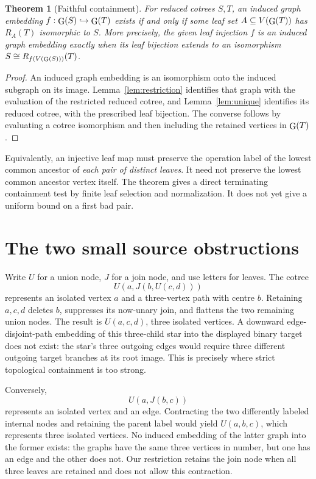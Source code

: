 \documentclass[11pt]{article}
\newtheorem{theorem}{Theorem}
\newcommand{\ev}{\mathop{\rm G}}
\begin{document}
\begin{theorem}[Faithful containment]\label{thm:faithful}
For reduced cotrees $S,T$, an induced graph embedding
$f:\ev(S)\hookrightarrow\ev(T)$ exists if and only if some leaf set
$A\subseteq V(\ev(T))$ has $R_A(T)$ isomorphic to $S$. More precisely,
the given leaf injection $f$ is an induced graph embedding exactly when
its leaf bijection extends to an isomorphism
$S\cong R_{f(V(\ev(S)))}(T)$.
\end{theorem}
\begin{proof}
An induced graph embedding is an isomorphism onto the induced subgraph on
its image. Lemma~\ref{lem:restriction} identifies that graph with the
evaluation of the restricted reduced cotree, and Lemma~\ref{lem:unique}
identifies its reduced cotree, with the prescribed leaf bijection.
The converse follows by evaluating a cotree isomorphism and then including
the retained vertices in $\ev(T)$.
\end{proof}

Equivalently, an injective leaf map must preserve the operation label of
the lowest common ancestor of \emph{each pair of distinct leaves}. It
need not preserve the lowest common ancestor vertex itself. The theorem
gives a direct terminating containment test by finite leaf selection and
normalization. It does not yet give a uniform bound on a first bad pair.

\section{The two small source obstructions}
Write $U$ for a union node, $J$ for a join node, and use letters for leaves.
The cotree
\[
                U(a,J(b,U(c,d)))
\]
represents an isolated vertex $a$ and a three-vertex path with centre $b$.
Retaining $a,c,d$ deletes $b$, suppresses its now-unary join, and flattens
the two remaining union nodes. The result is $U(a,c,d)$, three isolated
vertices. A downward edge-disjoint-path embedding of this three-child star
into the displayed binary target does not exist: the star's three outgoing
edges would require three different outgoing target branches at its root
image. This is precisely where strict topological containment is too strong.

Conversely,
\[
                         U(a,J(b,c))
\]
represents an isolated vertex and an edge. Contracting the two differently
labeled internal nodes and retaining the parent label would yield
$U(a,b,c)$, which represents three isolated vertices. No induced embedding
of the latter graph into the former exists: the graphs have the same three
vertices in number, but one has an edge and the other does not. Our
restriction retains the join node when all three leaves are retained and
does not allow this contraction.
\end{document}
